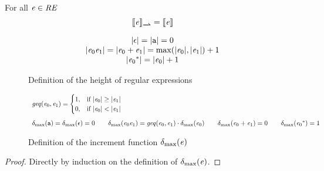 \begin{corollary}
 For all $\mathit {e}\in\mathit {RE}$
 \[
  \opSem{\re}{\parDer{}{}}=\sem{\re}
 \]
\end{corollary}

\begin{figure}
 $$
  \begin{array}{c}
   {\mid}{\ensuremath{\mathtt {\epsilon}}}{\mid}={\mid}{\mathtt {a}}{\mid}=0                                                              \\
   {\mid}{\mathit {e}_0\mathit {e}_1}{\mid}={\mid}{\mathit {e}_0\mathbin{+}\mathit {e}_1}{\mid}=\max({\mid}{\mathit {e}_0}{\mid},{\mid}{\mathit {e}_1}{\mid})+1 \\
   {\mid}{{\mathit {e}_0}^*}{\mid}={\mid}{\mathit {e}_0}{\mid}+1
  \end{array}
 $$
 \caption{Definition of the height of regular expressions}
 \label{fig:height}
\end{figure}

\begin{figure}
 $$
  \begin{array}{l}
   \mathit{geq}({\mathit {e}_0},{\mathit {e}_1})=
   \begin{cases}
    1, & \text{if } {\mid}{\ensuremath{\mathit {e}}_0}{\mid} \geq {\mid}{\ensuremath{\mathit {e}}_1}{\mid} \\
    0, & \text{if } {\mid}{\ensuremath{\mathit {e}}_0}{\mid} < {\mid}{\mathit {e}_1}{\mid}
   \end{cases} \\[4ex]
   {\delta_{\max}}({\mathtt {a}})={\delta_{\max}}({\mathtt {\epsilon}})=0                                      \qquad
   {\delta_{\max}}({\mathit {e}_0\mathit {e}_1})=\mathit{geq}({\mathit {e}_0},{\mathit {e}_1})\cdot{\delta_{\max}}({\mathit {e}_0}) \qquad
   {\delta_{\max}}({\mathit {e}_0\mathbin{+}\mathit {e}_1})=0                                         \qquad
   {\delta_{\max}}({{\mathit {e}_0}^*})=1
  \end{array}
 $$
 \caption{Definition of the increment function ${\delta_{\max}}({\mathit {e}})$}
 \label{fig:inc-pred}
\end{figure}

\begin{proof}
 Directly by induction on the definition of ${\delta_{\max}}({\mathit {e}})$.
\end{proof}


